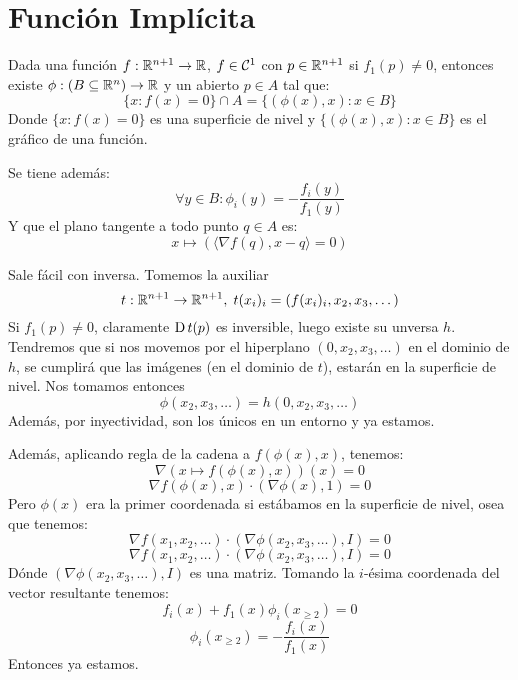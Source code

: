 \documentclass{article}
\begin{document}
    \section*{Función Implícita}
    \begin{teo}
    Dada una función $f : \mathbb{R}^{n+1} \to \mathbb{R}$, $f \in \mathcal{C}^1$ con $p \in \mathbb{R}^{n+1}$ si $f_1(p) \neq 0$, entonces existe $\phi : (B \subseteq \mathbb{R}^n) \to \mathbb{R}$ y un abierto $p \in A$ tal que:
    \[
        \{x : f(x) = 0\} \cap A = \{(\phi(x), x) : x \in B\}
    \]
    Donde $\{x : f(x) = 0\}$ es una superficie de nivel y $\{(\phi(x), x) : x \in B\}$ es el gráfico de una función.

    Se tiene además:
    \[
        \forall y \in B : \phi_i(y) = -\frac{f_i(y)}{f_1(y)}
    \]
    Y que el plano tangente a todo punto $q \in A$ es:
    \[
        x \mapsto (\langle \nabla f(q), x - q \rangle = 0)
    \]
    \end{teo}
    \begin{demo}
        Sale fácil con inversa. Tomemos la auxiliar
        \[t : \mathbb{R}^{n+1} \to \mathbb{R}^{n+1}, \; t(x_i)_i = (f(x_i)_i, x_2, x_3, \dots)\]
        Si $f_1(p) \neq 0$, claramente $\operatorname{D} t(p)$ es inversible, luego existe su unversa $h$. Tendremos que si nos movemos por el hiperplano $(0, x_2, x_3, \dots)$ en el dominio de $h$, se cumplirá que las imágenes (en el dominio de $t$), estarán en la superficie de nivel. Nos tomamos entonces
        \[\phi(x_2,x_3,\dots) = h(0,x_2,x_3,\dots)\]
        Además, por inyectividad, son los únicos en un entorno y ya estamos.

        Además, aplicando regla de la cadena a $f(\phi(x), x)$, tenemos:
        \[\nabla (x \mapsto f(\phi(x), x))(x) = 0\]
        \[\nabla f(\phi(x), x) \cdot (\nabla \phi(x), 1) = 0\]
        Pero $\phi(x)$ era la primer coordenada si estábamos en la superficie de nivel, osea que tenemos:
        \[\nabla f(x_1,x_2,\dots) \cdot (\nabla \phi(x_2,x_3,\dots), I) = 0\]
        \[\nabla f(x_1,x_2,\dots) \cdot (\nabla \phi(x_2,x_3,\dots), I) = 0\]
        Dónde $(\nabla \phi(x_2,x_3,\dots), I)$ es una matriz. Tomando la $i$-ésima coordenada del vector resultante tenemos:
        \[f_i(x) + f_1(x)\phi_i(x_{\geq 2}) = 0\]
        \[\phi_i(x_{\geq 2}) = -\frac{f_i(x)}{f_1(x)}\]
        Entonces ya estamos.
    \end{demo}
\end{document}
